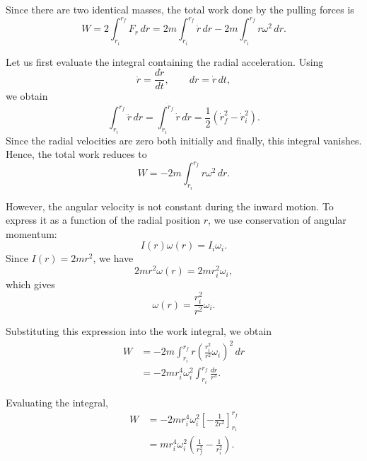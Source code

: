 \documentclass[../main.tex]{subfiles}
\begin{document}
Since there are two identical masses, the total work done by the pulling forces is
\begin{equation}
    W=2\int_{r_i}^{r_f}F_r\,dr
    =2m\int_{r_i}^{r_f}\ddot{r}\,dr
    -2m\int_{r_i}^{r_f}r\omega^2\,dr.
\end{equation}

Let us first evaluate the integral containing the radial acceleration. Using
\begin{equation}
    \ddot{r}=\frac{d\dot{r}}{dt},
    \qquad
    dr=\dot{r}\,dt,
\end{equation}
we obtain
\begin{equation}
    \int_{r_i}^{r_f}\ddot{r}\,dr
    =\int_{\dot{r}_i}^{\dot{r}_f}\dot{r}\,d\dot{r}
    =\frac{1}{2}\left(\dot{r}_f^2-\dot{r}_i^2\right).
\end{equation}
Since the radial velocities are zero both initially and finally, this integral vanishes. Hence, the total work reduces to
\begin{equation}
    W=-2m\int_{r_i}^{r_f}r\omega^2\,dr.
\end{equation}

However, the angular velocity is not constant during the inward motion. To express it as a function of the radial position $r$, we use conservation of angular momentum:
\begin{equation}
    I(r)\omega(r)=I_i\omega_i.
\end{equation}
Since $I(r)=2mr^2$, we have
\begin{equation}
    2mr^2\omega(r)=2mr_i^2\omega_i,
\end{equation}
which gives
\begin{equation}
    \omega(r)=\frac{r_i^2}{r^2}\omega_i.
\end{equation}

Substituting this expression into the work integral, we obtain
\begin{align}
    W
    &=-2m\int_{r_i}^{r_f}
    r\left(\frac{r_i^2}{r^2}\omega_i\right)^2\,dr\\
    &=-2mr_i^4\omega_i^2
    \int_{r_i}^{r_f}\frac{dr}{r^3}.
\end{align}

Evaluating the integral,
\begin{align}
    W
    &=-2mr_i^4\omega_i^2
    \left[-\frac{1}{2r^2}\right]_{r_i}^{r_f}\\
    &=mr_i^4\omega_i^2
    \left(\frac{1}{r_f^2}-\frac{1}{r_i^2}\right).
\end{align}
\end{document}
